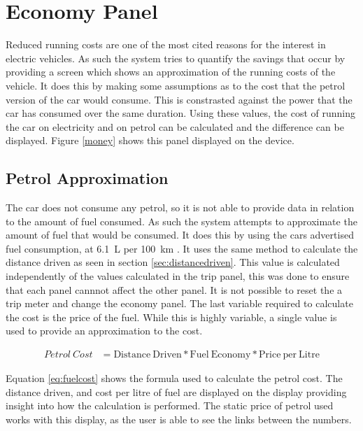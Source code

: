 

\section{Economy Panel}

Reduced running costs are one of the most cited reasons for the interest in electric vehicles. As such the system tries to quantify the savings that occur by providing a screen which shows an approximation of the running costs of the vehicle. It does this by making some assumptions as to the cost that the petrol version of the car would consume. This is constrasted against the power that the car has consumed over the same duration. Using these values, the cost of running the car on electricity and on petrol can be calculated and the difference can be displayed. Figure \ref{money} shows this panel displayed on the device.


\subsection{Petrol Approximation}

The car does not consume any petrol, so it is not able to provide data in relation to the amount of fuel consumed. As such the system attempts to approximate the amount of fuel that would be consumed. It does this by using the cars advertised fuel consumption, at 6.1~L per 100~km \cite{getz_fuel_consumption}. It uses the same method to calculate the distance driven as seen in section \ref{sec:distancedriven}. This value is calculated independently of the values calculated in the trip panel, this was done to ensure that each panel cannnot affect the other panel. It is not possible to reset the a trip meter and change the economy panel. The last variable required to calculate the cost is the price of the fuel. While this is highly variable, a single value is used to provide an approximation to the cost.

\begin{align}
\label{eq:fuelcost}
Petrol\ Cost &=\mathrm{Distance\ Driven} * \mathrm{Fuel\ Economy} *\mathrm{Price\ per\ Litre}
\end{align}

Equation \ref{eq:fuelcost} shows the formula used to calculate the petrol cost. The distance driven, and cost per litre of fuel are displayed on the display providing insight into how the calculation is performed. The static price of petrol used works with this display, as the user is able to see the links between the numbers.





